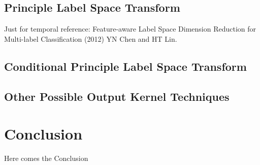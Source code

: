 \documentclass[12pt]{article}
\theoremstyle{definition}
\theoremstyle{remark}
\begin{document}
\subsection{Principle Label Space Transform}
Just for temporal reference: Feature-aware Label Space Dimension Reduction for Multi-label Classification (2012) YN Chen and HT Lin.
\subsection{Conditional Principle Label Space Transform}
\subsection{Other Possible Output Kernel Techniques}

\section{Conclusion}
Here comes the Conclusion






\end{document}
